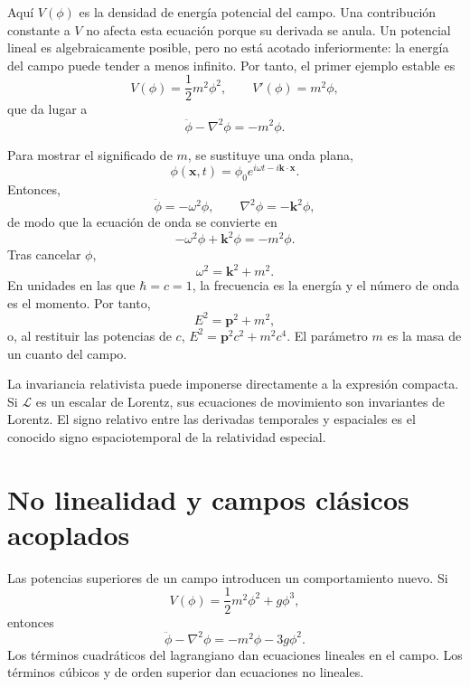 Aquí \(V(\phi)\) es la densidad de energía potencial del campo. Una contribución constante a \(V\) no afecta esta ecuación porque su derivada se anula. Un potencial lineal es algebraicamente posible, pero no está acotado inferiormente: la energía del campo puede tender a menos infinito. Por tanto, el primer ejemplo estable es
\begin{equation}
V(\phi)=\frac12m^2\phi^2,
\qquad
V'(\phi)=m^2\phi,
\end{equation}
que da lugar a
\begin{equation}
\ddot\phi-\nabla^2\phi=-m^2\phi.
\end{equation}

Para mostrar el significado de \(m\), se sustituye una onda plana,
\begin{equation}
\phi(\mathbf x,t)=\phi_0e^{i\omega t-i\mathbf k\cdot\mathbf x}.
\end{equation}
Entonces,
\begin{equation}
\ddot\phi=-\omega^2\phi,
\qquad
\nabla^2\phi=-\mathbf k^2\phi,
\end{equation}
de modo que la ecuación de onda se convierte en
\begin{equation}
-\omega^2\phi+\mathbf k^2\phi=-m^2\phi.
\end{equation}
Tras cancelar \(\phi\),
\begin{equation}
\omega^2=\mathbf k^2+m^2.
\end{equation}
En unidades en las que \(\hbar=c=1\), la frecuencia es la energía y el número de onda es el momento. Por tanto,
\begin{equation}
E^2=\mathbf p^2+m^2,
\end{equation}
o, al restituir las potencias de \(c\), \(E^2=\mathbf p^2c^2+m^2c^4\). El parámetro \(m\) es la masa de un cuanto del campo.

La invariancia relativista puede imponerse directamente a la expresión compacta. Si \(\mathcal L\) es un escalar de Lorentz, sus ecuaciones de movimiento son invariantes de Lorentz. El signo relativo entre las derivadas temporales y espaciales es el conocido signo espaciotemporal de la relatividad especial.

\section{No linealidad y campos clásicos acoplados}

Las potencias superiores de un campo introducen un comportamiento nuevo. Si
\begin{equation}
V(\phi)=\frac12m^2\phi^2+g\phi^3,
\end{equation}
entonces
\begin{equation}
\ddot\phi-\nabla^2\phi=-m^2\phi-3g\phi^2.
\end{equation}
Los términos cuadráticos del lagrangiano dan ecuaciones lineales en el campo. Los términos cúbicos y de orden superior dan ecuaciones no lineales.

